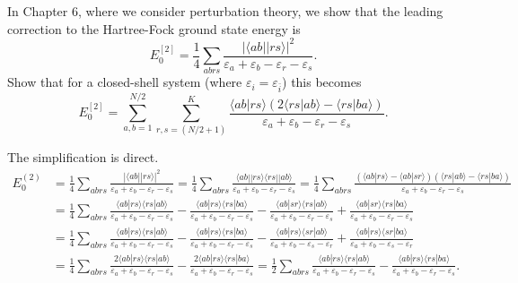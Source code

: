 \documentclass[a4paper]{book}
\newcounter{exercise}[chapter]
\newcounter{solution}[chapter]
\begin{document}
	\begin{exercise}
	In Chapter 6, where we consider perturbation theory, we show that the leading correction to the Hartree-Fock ground state energy is
	\[
		E^{[2]}_0 = \frac{1}{4} \sum_{abrs} \frac{ | \langle ab|| rs \rangle |^2 }{ \varepsilon_a + \varepsilon_b - \varepsilon_r - \varepsilon_s }.
	\]
	Show that for a closed-shell system (where $\varepsilon_i = \varepsilon_{\bar{i}}$) this becomes
	\[
		E^{[2]}_0 = \sum_{a,b=1}^{N/2} \sum_{r,s=(N/2+1)}^K \frac{ \langle ab|rs \rangle ( 2\langle rs | ab \rangle - \langle rs | ba \rangle ) }{ \varepsilon_a + \varepsilon_b - \varepsilon_r - \varepsilon_s }.
	\]
	\end{exercise}
	
	\begin{solution}
	
	The simplification is direct.	
	\begin{align*}
		E^{(2)}_0 &= \frac{1}{4} \sum_{abrs} \frac{ | \langle ab || rs \rangle |^2 }{ \varepsilon_a + \varepsilon_b - \varepsilon_r - \varepsilon_s } = \frac{1}{4} \sum_{abrs} \frac{ \langle ab || rs \rangle \langle rs || ab \rangle }{ \varepsilon_a + \varepsilon_b - \varepsilon_r - \varepsilon_s } = \frac{1}{4} \sum_{abrs} \frac{ ( \langle ab | rs \rangle - \langle ab | sr \rangle ) ( \langle rs | ab \rangle - \langle rs | ba \rangle )  }{ \varepsilon_a + \varepsilon_b - \varepsilon_r - \varepsilon_s } \\
		&= \frac{1}{4} \sum_{abrs} \frac{ \langle ab | rs \rangle \langle rs | ab \rangle  }{ \varepsilon_a + \varepsilon_b - \varepsilon_r - \varepsilon_s } - \frac{ \langle ab | rs \rangle\langle rs | ba \rangle }{ \varepsilon_a + \varepsilon_b - \varepsilon_r - \varepsilon_s } - \frac{ \langle ab | sr \rangle \langle rs | ab \rangle }{ \varepsilon_a + \varepsilon_b - \varepsilon_r - \varepsilon_s } + \frac{ \langle ab | sr \rangle \langle rs | ba \rangle }{ \varepsilon_a + \varepsilon_b - \varepsilon_r - \varepsilon_s } \\
		&= \frac{1}{4} \sum_{abrs} \frac{ \langle ab | rs \rangle \langle rs | ab \rangle  }{ \varepsilon_a + \varepsilon_b - \varepsilon_r - \varepsilon_s } - \frac{ \langle ab | rs \rangle\langle rs | ba \rangle }{ \varepsilon_a + \varepsilon_b - \varepsilon_r - \varepsilon_s } - \frac{ \langle ab | rs \rangle \langle sr | ab \rangle }{ \varepsilon_a + \varepsilon_b - \varepsilon_s - \varepsilon_r } + \frac{ \langle ab | rs \rangle \langle sr | ba \rangle }{ \varepsilon_a + \varepsilon_b - \varepsilon_s - \varepsilon_r } \\
		&= \frac{1}{4} \sum_{abrs} \frac{ 2 \langle ab | rs \rangle \langle rs | ab \rangle  }{ \varepsilon_a + \varepsilon_b - \varepsilon_r - \varepsilon_s } - \frac{ 2 \langle ab | rs \rangle\langle rs | ba \rangle }{ \varepsilon_a + \varepsilon_b - \varepsilon_r - \varepsilon_s } = \frac{1}{2} \sum_{abrs} \frac{ \langle ab | rs \rangle \langle rs | ab \rangle  }{ \varepsilon_a + \varepsilon_b - \varepsilon_r - \varepsilon_s } - \frac{ \langle ab | rs \rangle\langle rs | ba \rangle }{ \varepsilon_a + \varepsilon_b - \varepsilon_r - \varepsilon_s } .
	\end{align*}
	

\end{solution}
\end{document}
